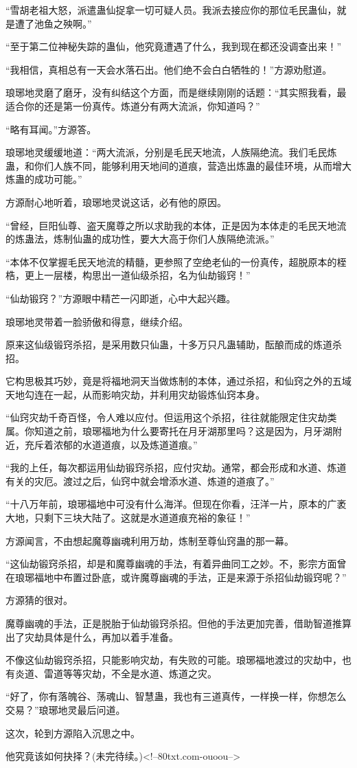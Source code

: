 \begin{this_body}
“雪胡老祖大怒，派遣蛊仙捉拿一切可疑人员。我派去接应你的那位毛民蛊仙，就是遭了池鱼之殃啊。”

“至于第二位神秘失踪的蛊仙，他究竟遭遇了什么，我到现在都还没调查出来！”

“我相信，真相总有一天会水落石出。他们绝不会白白牺牲的！”方源劝慰道。

琅琊地灵磨了磨牙，没有纠结这个方面，而是继续刚刚的话题：“其实照我看，最适合你的还是第一份真传。炼道分有两大流派，你知道吗？”

“略有耳闻。”方源答。

琅琊地灵缓缓地道：“两大流派，分别是毛民天地流，人族隔绝流。我们毛民炼蛊，和你们人族不同，能够利用天地间的道痕，营造出炼蛊的最佳环境，从而增大炼蛊的成功可能。”

方源耐心地听着，琅琊地灵说这话，必有他的原因。

“曾经，巨阳仙尊、盗天魔尊之所以求助我的本体，正是因为本体走的毛民天地流的炼蛊法，炼制仙蛊的成功性，要大大高于你们人族隔绝流派。”

“本体不仅掌握毛民天地流的精髓，更参照了空绝老仙的一份真传，超脱原本的桎梏，更上一层楼，构思出一道仙级杀招，名为仙劫锻窍！”

“仙劫锻窍？”方源眼中精芒一闪即逝，心中大起兴趣。

琅琊地灵带着一脸骄傲和得意，继续介绍。

原来这仙级锻窍杀招，是采用数只仙蛊，十多万只凡蛊辅助，酝酿而成的炼道杀招。

它构思极其巧妙，竟是将福地洞天当做炼制的本体，通过杀招，和仙窍之外的五域天地勾连在一起，从而影响灾劫，并利用灾劫锻炼仙窍本身。

“仙窍灾劫千奇百怪，令人难以应付。但运用这个杀招，往往就能限定住灾劫类属。你知道之前，琅琊福地为什么要寄托在月牙湖那里吗？这是因为，月牙湖附近，充斥着浓郁的水道道痕，以及炼道道痕。”

“我的上任，每次都运用仙劫锻窍杀招，应付灾劫。通常，都会形成和水道、炼道有关的灾厄。渡过之后，仙窍中就会增添水道、炼道的道痕了。”

“十八万年前，琅琊福地中可没有什么海洋。但现在你看，汪洋一片，原本的广袤大地，只剩下三块大陆了。这就是水道道痕充裕的象征！”

方源闻言，不由想起魔尊幽魂利用万劫，炼制至尊仙窍蛊的那一幕。

“这仙劫锻窍杀招，却是和魔尊幽魂的手法，有着异曲同工之妙。不，影宗方面曾在琅琊福地中布置过卧底，或许魔尊幽魂的手法，正是来源于杀招仙劫锻窍呢？”

方源猜的很对。

魔尊幽魂的手法，正是脱胎于仙劫锻窍杀招。但他的手法更加完善，借助智道推算出了灾劫具体是什么，再加以着手准备。

不像这仙劫锻窍杀招，只能影响灾劫，有失败的可能。琅琊福地渡过的灾劫中，也有炎道、雷道等等灾劫，不全是水道、炼道之灾。

“好了，你有落魄谷、荡魂山、智慧蛊，我也有三道真传，一样换一样，你想怎么交易？”琅琊地灵最后问道。

这次，轮到方源陷入沉思之中。

他究竟该如何抉择？(未完待续。)<!--80txt.com-ouoou-->

\end{this_body}

